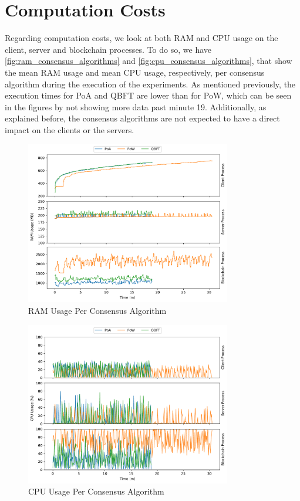 \section{Computation Costs}

Regarding computation costs, we look at both RAM and CPU usage on the client, server and blockchain processes. To do so, we have \autoref{fig:ram_consensus_algorithms} and \autoref{fig:cpu_consensus_algorithms}, that show the mean RAM usage and mean CPU usage, respectively, per consensus algorithm during the execution of the experiments. As mentioned previously, the execution times for PoA and QBFT are lower than for PoW, which can be seen in the figures by not showing more data past minute 19. Additionally, as explained before, the consensus algorithms are not expected to have a direct impact on the clients or the servers.

\begin{figure}[!hpt]
    \centering
    \centering
    \includegraphics[width=0.8\textwidth]{graphics/consensus/ram.pdf}
    \caption{RAM Usage Per Consensus Algorithm}
    \label{fig:ram_consensus_algorithms}
\end{figure}

\begin{figure}[!hpb]
    \centering
    \centering
    \includegraphics[width=0.8\textwidth]{graphics/consensus/cpu.pdf}
    \caption{CPU Usage Per Consensus Algorithm}
    \label{fig:cpu_consensus_algorithms}
\end{figure}

